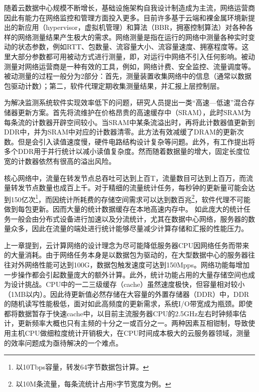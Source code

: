 \label{chap35}

\label{chap351}

随着云数据中心规模不断增长，基础设施架构自我设计制造成为主流，网络运营商因此有能力在网络监控和管理方面投入更多。目前许多基于云端和裸金属环境新提出的新应用（hypervisor，虚拟机管理）和算法（BBR，拥塞控制算法）对各种各样的网络测量结果产生极大的需求。网络测量是指在运行的网络中测量各种实时变动的状态参数，例如RTT、包数量、流容量大小、流容量速度、拥塞程度等。这里大部分参数都可用被动方式进行测量，即，对运行中网络不引入任何影响。被动测量对网络运营商是一种有效的工具，例如，网络计费、安全监控、流量调度等。被动测量的过程一般分为2部分：首先，测量装置收集网络中的信息（通常以数据包驱动计数）；第二，软件代理定期收集测量结果，并汇报上层控制层。


为解决监测系统软件实现效率低下的问题，研究人员提出一类“高速---低速”混合存储器更新方案。首先将流维护在价格昂贵的高速缓存中（SRAM），此时SRAM为每条流的计数器开辟空间较小。当SRAM中某条流溢出时，再将此计数器值更新到DDR中，并为SRAM中对应的计数器清零。此方法有效减缓了DRAM的更新次数。但是会引入读值速度慢，硬件电路结构设计复杂等问题。此外，有工作提出将多个DDR用于并行统计以减小读值复杂度。然而随着数据量的增大，固定长度位宽的计数器依然有很高的溢出风险。

核心网络中，流量在转发节点总吞吐可达到上百T，流量数目可达到上百万，而流量转发节点数量也成百上千。对于精细的流量统计任务，每秒钟的更新量可能会达到150亿次\footnote{以10Tbps容量，转发64字节数据包计算。}，而因统计所耗费的存储空间需求可以达到数百兆\footnote{以10M条流量，每条流统计占用8字节宽度为例。}，软件代理不可能做到每包更新。因而大量的统计数据缓存在本地高速内存中。
如此庞大的统计任务一般会由分布式设备进行加速以及分流统计，尤其在数据中心网络，服务器的数量众多，因此在流量的端处进行统计能够尽量减少计算存储和汇报的性能压力。

上一章提到，云计算网络的设计理念为尽可能降低服务器CPU因网络任务而带来的大量消耗。由于网络任务本身是以数据包为驱动的，在大型数据中心的服务器往往对外网络性能可达到100G，数据包触发速度可达到150Mpps。网络功能每增加一步操作都会引起数量庞大的额外计算。此外，统计功能占用的大量存储空间也成为设计挑战。CPU中的一二三级缓存（cache）虽然速度极快，但容量相对较小（1MB以内）。因此待更新值必然存储在大容量的外置存储器（DDR）中，DDR的随机读写性能极低，面对如此高频度的更新需求，系统I/O带宽成为瓶颈。即使都将数据暂存于快速cache中，以目前主流服务器CPU的2.5GHz左右时钟频率估计，更新频率大概也只有主频的十分之一或百分之一。两种因素互相钳制，导致使用主机CPU做细粒度统计开销极大，在CPU时间成本极大的云服务器领域，测量的效率问题成为亟待解决的一个难点。

